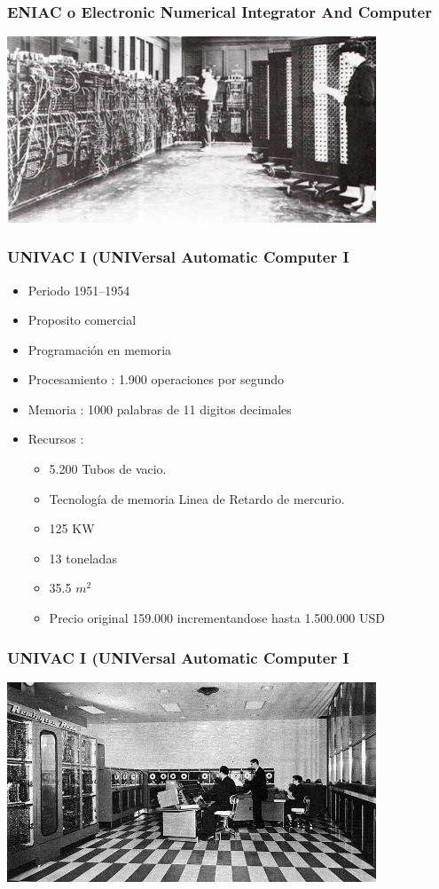 \documentclass{beamer}
\begin{document}
\begin{frame}
\frametitle{ENIAC o Electronic Numerical Integrator And Computer}
\begin{center}
	\includegraphics[width=11cm]{ENIAC.png}
\end{center}
\end{frame}

\begin{frame}
\frametitle{UNIVAC I (UNIVersal Automatic Computer I}
	\begin{itemize}
		\item Periodo 1951–1954
		\item Proposito comercial
		\item Programación en memoria
		\item Procesamiento : 1.900 operaciones por segundo
		\item Memoria : 1000 palabras de 11 digitos decimales
		\item Recursos :
			\begin{itemize}
				\item 5.200 Tubos de vacio.
				\item Tecnología de memoria Linea de Retardo de mercurio.
				\item 125 KW
				\item 13 toneladas
				\item 35.5 $m^{2}$
				\item Precio original 159.000 incrementandose hasta 1.500.000 USD
			\end{itemize}
	\end{itemize}
\end{frame}

\begin{frame}
	\frametitle{UNIVAC I (UNIVersal Automatic Computer I}
	\begin{center}
		\includegraphics[width=11cm]{UNIVAC-I-BRL61-0977.jpg}
	\end{center}
\end{frame}
\end{document}
